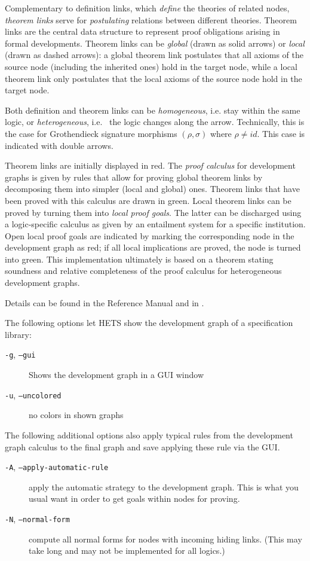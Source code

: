 \documentclass{article}
\newcommand{\normalTEXTSC}[2]{{#1\scriptsize#2}}
\newcommand     {\Hets}{\normalTEXTSC{H}{ETS}\xspace}
\begin{document}
Complementary to definition links, which \emph{define} the theories of
related nodes, \emph{theorem links} serve for \emph{postulating}
relations between different theories. Theorem links are the central
data structure to represent proof obligations arising in formal
developments.
Theorem links can be \emph{global} (drawn as solid arrows) or
\emph{local} (drawn as dashed arrows): a global theorem link
postulates that all axioms of the source node (including the inherited
ones) hold in the target node, while a local theorem link only postulates
that the local axioms of the source node hold in the target node.

Both definition and theorem links can be \emph{homogeneous},
i.e. stay within the same logic, or \emph{heterogeneous}, i.e.\ %
the logic changes along the arrow. Technically, this is the case
for Grothendieck signature morphisms $(\rho,\sigma)$ where
$\rho\not=id$. This case is indicated with double arrows.

Theorem links are initially displayed in red.
The \emph{proof
  calculus} for development graphs
\cite{MossakowskiEtAl05,Habil} is given by rules
that allow for proving global theorem links by decomposing them
into simpler (local and global) ones. Theorem links that have been
proved with this calculus are drawn in green. Local theorem links can
be proved by turning them into \emph{local proof goals}.  The latter
can be discharged using a logic-specific calculus as given by an
entailment system for a specific institution. Open local
proof goals are indicated by marking the corresponding node in the
development graph as red; if all local implications are proved, the
node is turned into green. This implementation ultimately is based
on a theorem \cite{Habil} stating soundness and relative completeness
of the proof calculus for heterogeneous development graphs.

Details can be found in the \CASL Reference Manual \cite[IV:4]{CASL/RefManual}
and in \cite{Habil,MossakowskiEtAl05,MossakowskiEtAl07b}.

The following options let \Hets show the development graph of
a specification library:
\begin{description}
\item[\texttt{-g}, \texttt{--gui}] Shows the development graph in a GUI window
\item[\texttt{-u}, \texttt{--uncolored}] no colors in shown graphs
\end{description}

The following additional options also apply typical rules from the development
graph calculus to the final graph and save applying these rule via the GUI.
\begin{description}
\item[\texttt{-A}, \texttt{--apply-automatic-rule}] apply the automatic
  strategy to the development graph. This is what you usual want in order to
  get goals within nodes for proving.
\item[\texttt{-N}, \texttt{--normal-form}] compute all normal forms for nodes
  with incoming hiding links. (This may take long and may not be implemented
  for all logics.)
\end{description}
\end{document}
